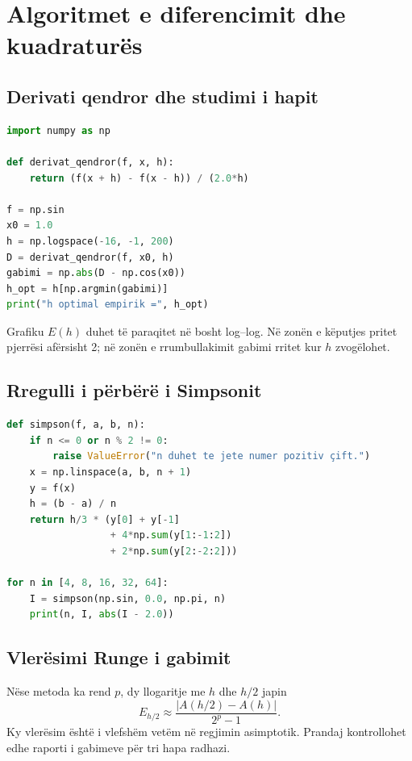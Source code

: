 \documentclass[11pt,oneside,openany]{book}
\begin{document}
\section{Algoritmet e diferencimit dhe kuadraturës}
\subsection{Derivati qendror dhe studimi i hapit}
\begin{lstlisting}[language=Python,caption={Gabimi i derivatit qendror për një varg hapash.}]
import numpy as np

def derivat_qendror(f, x, h):
    return (f(x + h) - f(x - h)) / (2.0*h)

f = np.sin
x0 = 1.0
h = np.logspace(-16, -1, 200)
D = derivat_qendror(f, x0, h)
gabimi = np.abs(D - np.cos(x0))
h_opt = h[np.argmin(gabimi)]
print("h optimal empirik =", h_opt)
\end{lstlisting}
Grafiku $E(h)$ duhet të paraqitet në bosht log--log. Në zonën e këputjes pritet pjerrësi afërsisht 2; në zonën e rrumbullakimit gabimi rritet kur $h$ zvogëlohet.

\subsection{Rregulli i përbërë i Simpsonit}
\begin{lstlisting}[language=Python,caption={Integrimi Simpson me kontrollin e numrit çift të nënintervaleve.}]
def simpson(f, a, b, n):
    if n <= 0 or n % 2 != 0:
        raise ValueError("n duhet te jete numer pozitiv çift.")
    x = np.linspace(a, b, n + 1)
    y = f(x)
    h = (b - a) / n
    return h/3 * (y[0] + y[-1]
                  + 4*np.sum(y[1:-1:2])
                  + 2*np.sum(y[2:-2:2]))

for n in [4, 8, 16, 32, 64]:
    I = simpson(np.sin, 0.0, np.pi, n)
    print(n, I, abs(I - 2.0))
\end{lstlisting}

\subsection{Vlerësimi Runge i gabimit}
Nëse metoda ka rend $p$, dy llogaritje me $h$ dhe $h/2$ japin
\begin{equation}
 E_{h/2}\approx\frac{|A(h/2)-A(h)|}{2^p-1}.
\end{equation}
Ky vlerësim është i vlefshëm vetëm në regjimin asimptotik. Prandaj kontrollohet edhe raporti i gabimeve për tri hapa radhazi.
\end{document}
